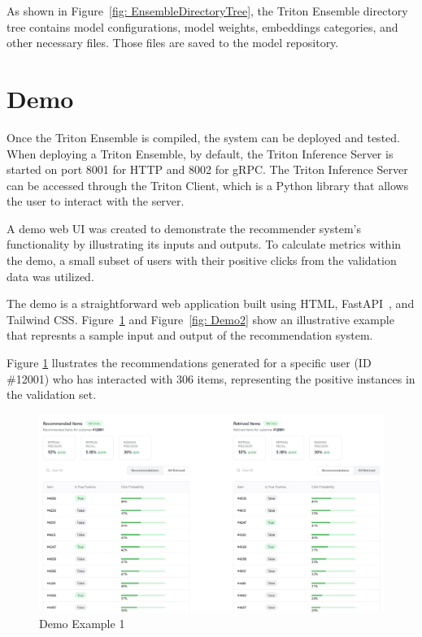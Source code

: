 As shown in Figure~\ref{fig: EnsembleDirectoryTree}, the Triton Ensemble directory tree contains model configurations, model weights, embeddings categories, and other necessary files.
Those files are saved to the model repository.

\section{Demo}

Once the Triton Ensemble is compiled, the system can be deployed and tested.
When deploying a Triton Ensemble, by default, the Triton Inference Server is started on port 8001 for HTTP and 8002 for gRPC.
The Triton Inference Server can be accessed through the Triton Client, which is a Python library that allows the user to interact with the server.

A demo web UI was created to demonstrate the recommender system's functionality by illustrating its inputs and outputs.
To calculate metrics within the demo, a small subset of users with their positive clicks from the validation data was utilized.

The demo is a straightforward web application built using HTML, FastAPI~\cite{FastAPI}, and Tailwind CSS.
Figure~\ref{fig: Demo1} and Figure~\ref{fig: Demo2} show an illustrative example that represnts a sample input and output of the recommendation system.

Figure \ref{fig: Demo1} llustrates the recommendations generated for a specific user (ID \#12001) who has interacted with 306 items, representing the positive instances in the validation set.


\begin{figure}[H]
    \centering
    \includegraphics[width=\textwidth]{assets/demo_1.jpeg}
    \caption{Demo Example 1}
    \label{fig: Demo1}
\end{figure}

